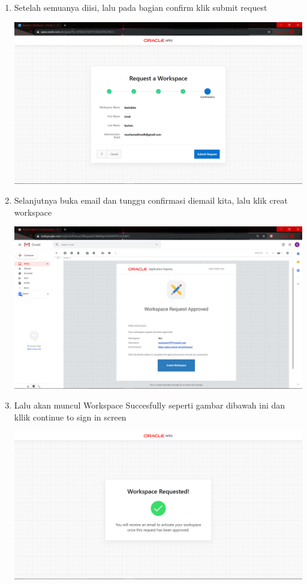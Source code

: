 \begin{enumerate}
	\item Setelah semuanya diisi, lalu pada bagian confirm klik submit request
	\begin{center}
    \includegraphics[scale=0.2]{Apex/5.png}
    \end{center}
	
	\item Selanjutnya buka email dan tunggu confirmasi diemail kita, lalu klik creat workspace 
	\begin{center}
    \includegraphics[scale=0.2]{Apex/6.png}
    \end{center}
	
	\item Lalu akan muncul Workspace Succesfully seperti gambar dibawah ini dan kllik continue to sign in screen
	\begin{center}
    \includegraphics[scale=0.2]{Apex/7.png}
    \end{center}
	

\end{enumerate}
